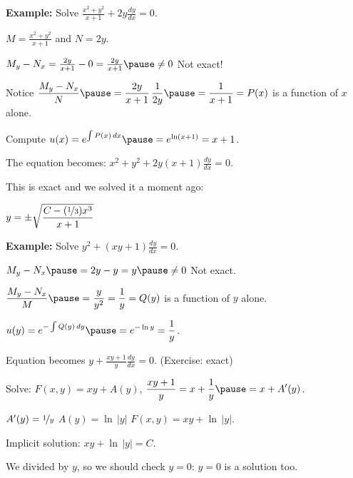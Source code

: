 \documentclass[10pt,aspectratio=169]{beamer}
\begin{document}
\begin{frame}

\textbf{Example:}
Solve \quad
$\displaystyle
\frac{x^2+y^2}{x+1} + 2y \frac{dy}{dx} = 0$.

\medskip
\pause

$M= \frac{x^2+y^2}{x+1}$ and $N=2y$.

\medskip
\pause

$M_y-N_x = \frac{2y}{x+1} - 0 = \frac{2y}{x+1} \pause \neq 0$
\pause
\wthus
Not exact!

\medskip
\pause

Notice
\quad
$\displaystyle
\frac{M_y-N_x}{N}
\pause
= \frac{2y}{x+1} \, \frac{1}{2y}
\pause
= \frac{1}{x+1}
= P(x)
$
\quad
is a function of $x$ alone.

\medskip
\pause

Compute \quad
$u(x) = 
e^{\int  P(x) \, dx}
\pause
=
e^{\ln (x+1)} = x+1$.

\medskip
\pause

The equation becomes: \quad
$\displaystyle
x^2+y^2 + 2y(x+1) \frac{dy}{dx} = 0$.

\medskip
\pause

This is exact and we solved it a moment ago:

\medskip

\quad $\displaystyle y = \pm \sqrt{\frac{C-(\nicefrac{1}{3})x^3}{x+1}}$
\end{frame}

\begin{frame}
\textbf{Example:}
Solve
$\displaystyle
y^2 + (xy+1) \frac{dy}{dx} = 0$.

\medskip
\pause

$M_y-N_x \pause = 2y-y = y \pause \neq 0$
\wthus
Not exact.

\medskip
\pause

$\displaystyle
\frac{M_y-N_x}{M} \pause = \frac{y}{y^2} = \frac{1}{y} =Q(y)$ 
\quad
is a function of $y$ alone.

\medskip
\pause

$\displaystyle
u(y)
= e^{-\int  Q(y) \, dy}
\pause
=
e^{-\ln y} = \frac{1}{y}$.

\medskip
\pause

Equation becomes
\quad
$\displaystyle y + \frac{xy+1}{y} \frac{dy}{dx} = 0$. \quad (Exercise: exact)

\medskip
\pause

Solve: \quad
$F(x,y) = xy + A(y)$,
\pause
\quad
$\displaystyle
\frac{xy+1}{y} = x+\frac{1}{y} \pause = x+ A'(y)$.

\medskip
\pause

$A'(y) = \nicefrac{1}{y}$
\pause
\wthus
$A(y) = \ln \, \lvert y \rvert$
\pause
\wthus
 $F(x,y) = xy + \ln \, \lvert y \rvert$.

\medskip
\pause

Implicit solution:
$xy + \ln \, \lvert y \rvert = C$.

\medskip
\pause

We divided by $y$, so we should check $y=0$:
\pause
\quad
$y=0$ is a solution too.
\end{frame}
\end{document}
